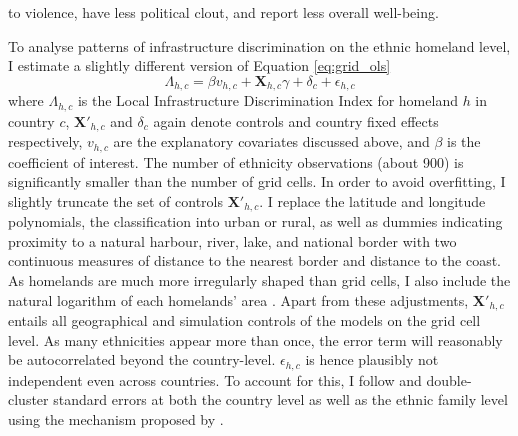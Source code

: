 \documentclass[11pt, oneside]{article}   	%
\begin{document}
to violence, have less political clout, and report less overall well-being.

To analyse patterns of infrastructure discrimination on the ethnic homeland level, I estimate a slightly different version of Equation \eqref{eq:grid_ols}
\begin{equation}
  \Lambda_{h,c} = \beta v_{h,c} + \textbf{X}_{h,c}\gamma + \delta_{c} + \epsilon_{h,c}
  \label{eq:ethn_ols}
\end{equation}
where $\Lambda_{h,c}$ is the Local Infrastructure Discrimination Index for homeland $h$ in country $c$, $\textbf{X}'_{h,c}$ and $\delta_{c}$ again denote controls and country fixed effects respectively, $v_{h,c}$ are the explanatory covariates discussed above, and $\beta$ is the coefficient of interest. The number of ethnicity observations (about 900) is significantly smaller than the number of grid cells. In order to avoid overfitting, I slightly truncate the set of controls $\textbf{X}'_{h,c}$. I replace the latitude and longitude polynomials, the classification into urban or rural, as well as dummies indicating proximity to a natural harbour, river, lake, and national border with two continuous measures of distance to the nearest border and distance to the coast. As homelands are much more irregularly shaped than grid cells, I also include the natural logarithm of each homelands' area \citep[as in][]{michalopoulos_long-run_2016}. Apart from these adjustments, $\textbf{X}'_{h,c}$ entails all geographical and simulation controls of the models on the grid cell level. As many ethnicities appear more than once, the error term will reasonably be autocorrelated beyond the country-level. $\epsilon_{h,c}$ is hence plausibly not independent even across countries. To account for this, I follow \cite{michalopoulos_long-run_2016} and double-cluster standard errors at both the country level as well as the ethnic family level using the mechanism proposed by \cite{Cameron_RobustInferenceMultiway_2011}.
\end{document}
